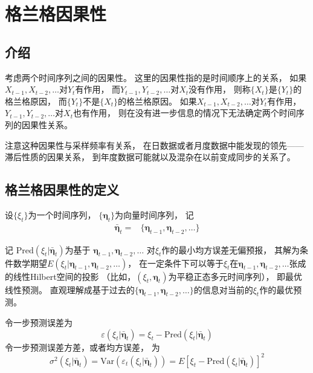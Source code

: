 \documentclass[
]{article}
\author{}
\date{\vspace{-2.5em}}
\theoremstyle{definition}
\theoremstyle{definition}
\theoremstyle{definition}
\theoremstyle{definition}
\theoremstyle{remark}
\begin{document}
{
\setcounter{tocdepth}{2}
\tableofcontents
}
\hypertarget{causal}{%
\section{格兰格因果性}\label{causal}}

\hypertarget{causal-intro}{%
\subsection{介绍}\label{causal-intro}}

考虑两个时间序列之间的因果性。
这里的因果性指的是时间顺序上的关系，
如果\(X_{t-1}, X_{t-2}, \dots\)对\(Y_t\)有作用，
而\(Y_{t-1}, Y_{t-2}, \dots\)对\(X_t\)没有作用，
则称\(\{X_t \}\)是\(\{ Y_t \}\)的格兰格原因，
而\(\{ Y_t \}\)不是\(\{ X_t \}\)的格兰格原因。
如果\(X_{t-1}, X_{t-2}, \dots\)对\(Y_t\)有作用，
\(Y_{t-1}, Y_{t-2}, \dots\)对\(X_t\)也有作用，
则在没有进一步信息的情况下无法确定两个时间序列的因果性关系。

注意这种因果性与采样频率有关系，
在日数据或者月度数据中能发现的领先------滞后性质的因果关系，
到年度数据可能就以及混杂在以前变成同步的关系了。

\hypertarget{causal-def}{%
\subsection{格兰格因果性的定义}\label{causal-def}}

设\(\{ \xi_t \}\)为一个时间序列，
\(\{ \boldsymbol{\eta}_t \}\)为向量时间序列，
记
\[\begin{aligned}
\bar{\boldsymbol{\eta}}_t =& \{ \boldsymbol{\eta}_{t-1}, \boldsymbol{\eta}_{t-2}, \dots \} 
\end{aligned}\]

记
\(\text{Pred}(\xi_t | \bar{\boldsymbol{\eta}}_t)\)为基于
\(\boldsymbol{\eta}_{t-1}, \boldsymbol{\eta}_{t-2}, \dots\)
对\(\xi_t\)作的最小均方误差无偏预报，
其解为条件数学期望\(E(\xi_t | \boldsymbol{\eta}_{t-1}, \boldsymbol{\eta}_{t-2}, \dots)\)，
在一定条件下可以等于\(\xi_t\)在\(\boldsymbol{\eta}_{t-1}, \boldsymbol{\eta}_{t-2}, \dots\)张成的线性Hilbert空间的投影
（比如，\((\xi_t, \boldsymbol{\eta}_t)\)为平稳正态多元时间序列），
即最优线性预测。
直观理解成基于过去的\(\{\boldsymbol{\eta}_{t-1}, \boldsymbol{\eta}_{t-2}, \dots \}\)的信息对当前的\(\xi_t\)作的最优预测。

令一步预测误差为
\[
  \varepsilon(\xi_t | \bar{\boldsymbol{\eta}}_t) 
  = \xi_t - \text{Pred}(\xi_t | \bar{\boldsymbol{\eta}}_t)
\]
令一步预测误差方差，或者均方误差，
为
\[
  \sigma^2(\xi_t | \bar{\boldsymbol{\eta}}_t)  
  = \text{Var}(\varepsilon_t(\xi_t | \bar{\boldsymbol{\eta}}_t) )
  = E \left[ \xi_t - \text{Pred}(\xi_t | \bar{\boldsymbol{\eta}}_t) \right]^2
\]
\end{document}

